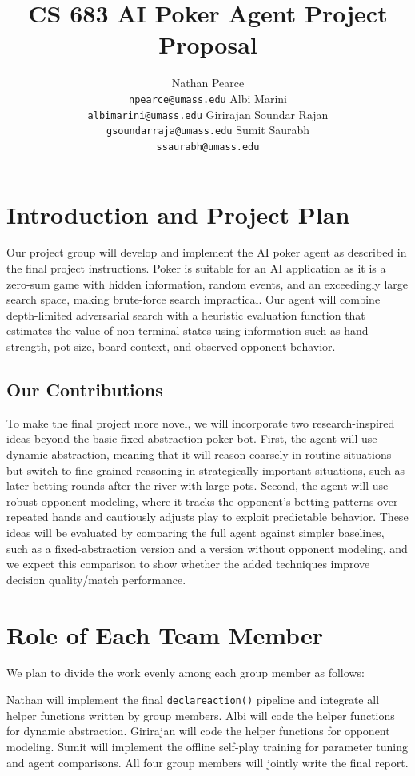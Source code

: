 \documentclass{article}
\title{CS 683 AI Poker Agent Project Proposal}
\author{%
  Nathan Pearce \\
  \texttt{npearce@umass.edu} \And
  Albi Marini \\
  \texttt{albimarini@umass.edu} \AND
  Girirajan Soundar Rajan \\
  \texttt{gsoundarraja@umass.edu} \And
  Sumit Saurabh \\
  \texttt{ssaurabh@umass.edu}
}
\theoremstyle{definition}
\begin{document}
\maketitle

\section{Introduction and Project Plan}

Our project group will develop and implement the AI poker agent as described in the final project instructions. Poker is suitable for an AI application as it is a zero-sum game with hidden information, random events, and an exceedingly large search space, making brute-force search impractical. Our agent will combine depth-limited adversarial search with a heuristic evaluation function that estimates the value of non-terminal states using information such as hand strength, pot size, board context, and observed opponent behavior.

\subsection{Our Contributions}

To make the final project more novel, we will incorporate two research-inspired ideas beyond the basic fixed-abstraction poker bot. First, the agent will use dynamic abstraction, meaning that it will reason coarsely in routine situations but switch to fine-grained reasoning in strategically important situations, such as later betting rounds after the river with large pots. Second, the agent will use robust opponent modeling, where it tracks the opponent's betting patterns over repeated hands and cautiously adjusts play to exploit predictable behavior. These ideas will be evaluated by comparing the full agent against simpler baselines, such as a fixed-abstraction version and a version without opponent modeling, and we expect this comparison to show whether the added techniques improve decision quality/match performance.

\section{Role of Each Team Member}

We plan to divide the work evenly among each group member as follows:

Nathan will implement the final \texttt{declareaction()} pipeline and integrate all helper functions written by group members. Albi will code the helper functions for dynamic abstraction. Girirajan will code the helper functions for opponent modeling. Sumit will implement the offline self-play training for parameter tuning and agent comparisons. All four group members will jointly write the final report.
\end{document}
